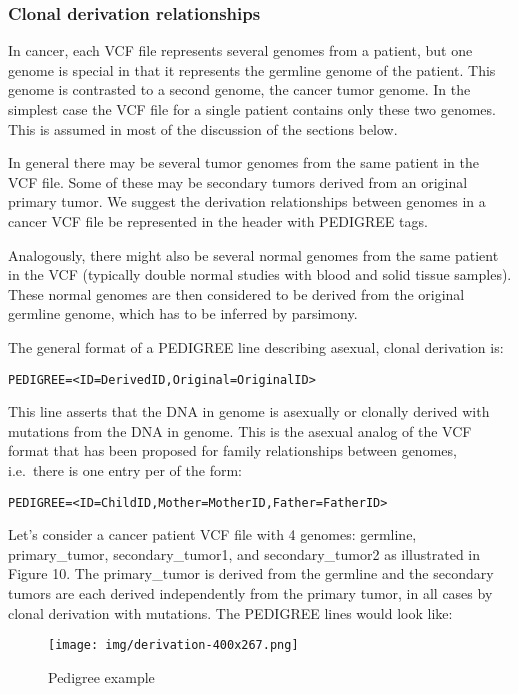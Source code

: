 \documentclass[8pt]{article}
\begin{document}
\subsubsection{Clonal derivation relationships}
\label{PedigreeInDetail}
In cancer, each VCF file represents several genomes from a patient, but one genome is special in that it represents the germline genome of the patient.
This genome is contrasted to a second genome, the cancer tumor genome.
In the simplest case the VCF file for a single patient contains only these two genomes.
This is assumed in most of the discussion of the sections below.

In general there may be several tumor genomes from the same patient in the VCF file.
Some of these may be secondary tumors derived from an original primary tumor.
We suggest the derivation relationships between genomes in a cancer VCF file be represented in the header with PEDIGREE tags.

Analogously, there might also be several normal genomes from the same patient in the VCF (typically double normal studies with blood and solid tissue samples).
These normal genomes are then considered to be derived from the original germline genome, which has to be inferred by parsimony.

The general format of a PEDIGREE line describing asexual, clonal derivation is:

\begin{verbatim}
PEDIGREE=<ID=DerivedID,Original=OriginalID>
\end{verbatim}

This line asserts that the DNA in genome is asexually or clonally derived with mutations from the DNA in genome.
This is the asexual analog of the VCF format that has been proposed for family relationships between genomes, i.e.\ there is one entry per of the form:

\begin{verbatim}
PEDIGREE=<ID=ChildID,Mother=MotherID,Father=FatherID>
\end{verbatim}

Let's consider a cancer patient VCF file with 4 genomes: germline, primary\_tumor, secondary\_tumor1, and secondary\_tumor2 as illustrated in Figure 10.
The primary\_tumor is derived from the germline and the secondary tumors are each derived independently from the primary tumor, in all cases by clonal derivation with mutations.
The PEDIGREE lines would look like:

\begin{figure}[ht]
\centering
\texttt{[image: img/derivation-400x267.png]}
\caption{Pedigree example}
\end{figure}
\end{document}
